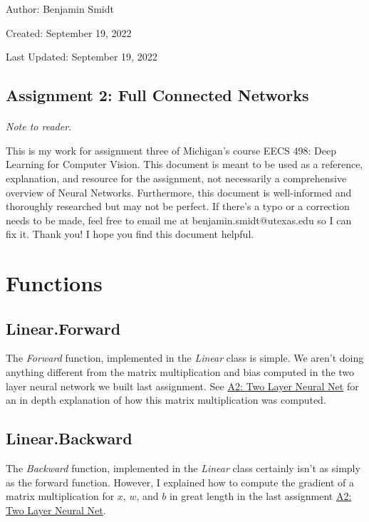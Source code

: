 \documentclass[12pt]{article}
\begin{document}
\noindent Author: Benjamin Smidt

\noindent Created: September 19, 2022

\noindent Last Updated: September 19, 2022
\begin{center}
\section*{Assignment 2: Full Connected Networks}
\end{center}

\paragraph{} \emph{Note to reader.} 

This is my work for assignment three of Michigan's course
EECS 498: Deep Learning for Computer Vision. This document is meant to be used as a reference, 
explanation, and resource for the assignment, not necessarily a comprehensive overview
of Neural Networks. Furthermore, this document is well-informed and thoroughly researched but
may not be perfect. If there's a typo or a correction needs to be made, feel free to 
email me at benjamin.smidt@utexas.edu so I can fix it. Thank you! I hope you find this 
document helpful.

\tableofcontents{}

\section{Functions}

\subsection{Linear.Forward}
The \emph{Forward} function, implemented in the \emph{Linear} class is simple. We aren't doing 
anything different from the matrix multiplication and bias computed in the two layer
neural network we built last assignment. See \href{https://github.com/bensmidt/EECS-498-DL-Computer-Vision/blob/main/A2/A2-Two-Layer-NN.pdf}
{A2: Two Layer Neural Net} for an in depth explanation of how this matrix multiplication was 
computed. 

\subsection{Linear.Backward}
The \emph{Backward} function, implemented in the \emph{Linear} class certainly isn't
as simply as the forward function. However, I explained how to compute the gradient of 
a matrix multiplication for $x$, $w$, and $b$ in great length in the last assignment 
\href{https://github.com/bensmidt/EECS-498-DL-Computer-Vision/blob/main/A2/A2-Two-Layer-NN.pdf}
{A2: Two Layer Neural Net}.
\end{document}
